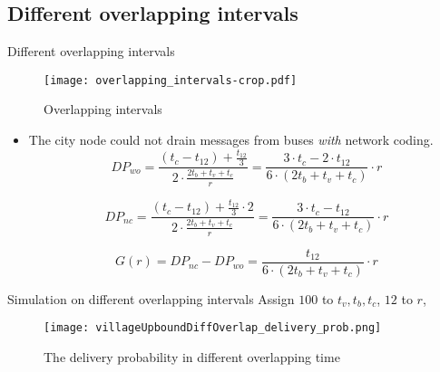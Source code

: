\documentclass[compress]{beamer}
\newcommand\Fontvi{\fontsize{6}{7.2}\selectfont}
\begin{document}
\subsection{Different overlapping intervals}
\begin{frame}{Different overlapping intervals}
	\begin{figure}
		\centering
		\texttt{[image: overlapping\_intervals-crop.pdf]}
		\caption{Overlapping intervals}
		\label{f_overlapping_intervals}
	\end{figure}
	
	\begin{itemize}
		\item The city node could not drain messages from buses \emph{with} network coding.
		      \Fontvi
		      \begin{equation}
		      	DP_{wo} 
		      	= \frac
		      	{(t_c - t_{12}) + \frac{t_{12}}{3}}
		      	{2 \cdot \frac{2t_b + t_v + t_c}{r}}
		      	= \frac{3 \cdot t_c - 2 \cdot t_{12}}{6 \cdot (2t_b + t_v + t_c)} \cdot r
		      \end{equation}
		      
		      \begin{equation}
		      	DP_{nc} 
		      	= \frac
		      	{(t_c - t_{12}) + \frac{t_{12}}{3} \cdot 2}
		      	{2 \cdot \frac{2t_b + t_v + t_c}{r}} 
		      	= \frac{3 \cdot t_c - t_{12}}{6 \cdot (2t_b + t_v + t_c)}\cdot r
		      \end{equation}
		      
		      
		      \begin{equation}
		      	G(r) = DP_{nc} - DP_{wo} =  \frac{t_{12}}{6 \cdot (2t_b + t_v + t_c)} \cdot r 
		      \end{equation}
	\end{itemize}
	
\end{frame}

\begin{frame}{Simulation on different overlapping intervals}
	Assign $100$ to $t_v, t_b, t_c$, $12$ to $r$,
	\begin{figure}[!t]
		\centering
		\texttt{[image: villageUpboundDiffOverlap\_delivery\_prob.png]}
		\caption{The delivery probability in different overlapping time}
		\label{f_diff_overlapping_wait_time}
	\end{figure}
\end{frame}
\end{document}
